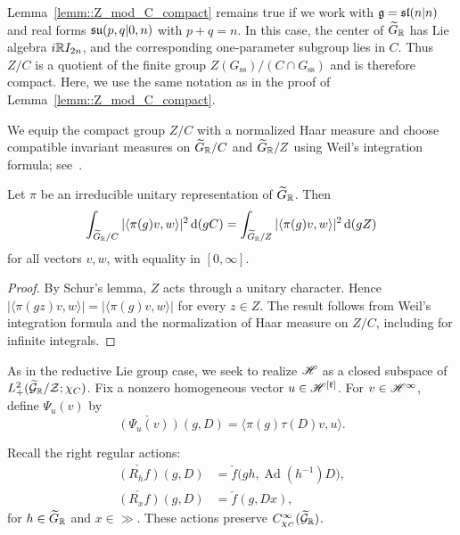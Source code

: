 \begin{remark}
Lemma~\ref{lemm::Z_mod_C_compact} remains true if we work with $\gg=\sl(n\vert n)$ and real forms $\su(p,q\vert 0,n)$ with $p+q=n$. In this case, the center of $\widetilde G_\RR$ has Lie algebra $i\RR I_{2n}$, and the corresponding one-parameter subgroup lies in $C$. Thus $Z/C$ is a quotient of the finite group $Z(G_{\mathrm{ss}})/(C\cap G_{\mathrm{ss}})$ and is therefore compact. Here, we use the same notation as in the proof of Lemma~\ref{lemm::Z_mod_C_compact}.
\end{remark}


We equip the compact group $Z/C$ with a normalized Haar measure and choose compatible invariant measures on $\widetilde{G}_{\RR}/C$ and $\widetilde{G}_{\RR}/Z$ using Weil's integration formula; see~\cite[Theorem~2.52]{Folland}.

\begin{lemma}\label{lemm::integral_comparison}
Let $\pi$ be an irreducible unitary representation of $\widetilde{G}_{\RR}$. Then
\begin{equation*}
\int_{\widetilde{G}_{\RR}/C}
|\langle\pi(g)v,w\rangle|^2\,\mathrm{d}(gC)
=
\int_{\widetilde{G}_{\RR}/Z}
|\langle\pi(g)v,w\rangle|^2\,\mathrm{d}(gZ)
\end{equation*}
for all vectors $v,w$, with equality in $[0,\infty]$.
\end{lemma}

\begin{proof}
By Schur's lemma, $Z$ acts through a unitary character. Hence
$
|\langle\pi(gz)v,w\rangle|
=
|\langle\pi(g)v,w\rangle|
$
for every $z\in Z$. The result follows from Weil's integration formula and the normalization of Haar measure on $Z/C$, including for infinite integrals.
\end{proof}


As in the reductive Lie group case, we seek to realize $\calH$ as a closed subspace of $L^2_+(\widetilde{\calG}_{\RR}/\calZ;\chi_C)$. Fix a nonzero homogeneous vector $u\in\calH^{[\kk]}$.
For $v\in\calH^\infty$, define $\Psi_u(v)$ by
\begin{equation}
\label{eq::coefficient_transform}
\check{(\Psi_u(v))}(g,D)
=
\langle\pi(g)\tau(D)v,u\rangle.
\end{equation}

Recall the right regular actions:
\begin{equation}
\begin{aligned}
\check{(R_hf)}(g,D)
&=
\check f\bigl(gh,\operatorname{Ad}(h^{-1})D\bigr),
\\
\check{(R_xf)}(g,D)
&=
\check f(g,Dx),
\end{aligned}
\end{equation}
for $h\in\widetilde{G}_{\RR}$ and $x\in\gg$.
These actions preserve
$C^\infty_{\chi_C}(\widetilde{\calG}_{\RR})$.

